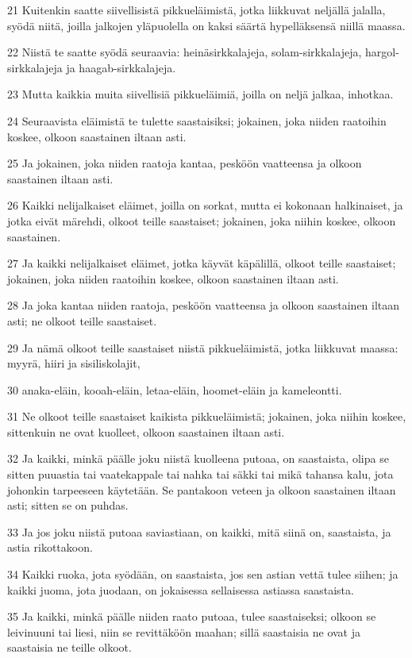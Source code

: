 \par 21 Kuitenkin saatte siivellisistä pikkueläimistä, jotka liikkuvat neljällä jalalla, syödä niitä, joilla jalkojen yläpuolella on kaksi säärtä hypelläksensä niillä maassa.
\par 22 Niistä te saatte syödä seuraavia: heinäsirkkalajeja, solam-sirkkalajeja, hargol-sirkkalajeja ja haagab-sirkkalajeja.
\par 23 Mutta kaikkia muita siivellisiä pikkueläimiä, joilla on neljä jalkaa, inhotkaa.
\par 24 Seuraavista eläimistä te tulette saastaisiksi; jokainen, joka niiden raatoihin koskee, olkoon saastainen iltaan asti.
\par 25 Ja jokainen, joka niiden raatoja kantaa, pesköön vaatteensa ja olkoon saastainen iltaan asti.
\par 26 Kaikki nelijalkaiset eläimet, joilla on sorkat, mutta ei kokonaan halkinaiset, ja jotka eivät märehdi, olkoot teille saastaiset; jokainen, joka niihin koskee, olkoon saastainen.
\par 27 Ja kaikki nelijalkaiset eläimet, jotka käyvät käpälillä, olkoot teille saastaiset; jokainen, joka niiden raatoihin koskee, olkoon saastainen iltaan asti.
\par 28 Ja joka kantaa niiden raatoja, pesköön vaatteensa ja olkoon saastainen iltaan asti; ne olkoot teille saastaiset.
\par 29 Ja nämä olkoot teille saastaiset niistä pikkueläimistä, jotka liikkuvat maassa: myyrä, hiiri ja sisiliskolajit,
\par 30 anaka-eläin, kooah-eläin, letaa-eläin, hoomet-eläin ja kameleontti.
\par 31 Ne olkoot teille saastaiset kaikista pikkueläimistä; jokainen, joka niihin koskee, sittenkuin ne ovat kuolleet, olkoon saastainen iltaan asti.
\par 32 Ja kaikki, minkä päälle joku niistä kuolleena putoaa, on saastaista, olipa se sitten puuastia tai vaatekappale tai nahka tai säkki tai mikä tahansa kalu, jota johonkin tarpeeseen käytetään. Se pantakoon veteen ja olkoon saastainen iltaan asti; sitten se on puhdas.
\par 33 Ja jos joku niistä putoaa saviastiaan, on kaikki, mitä siinä on, saastaista, ja astia rikottakoon.
\par 34 Kaikki ruoka, jota syödään, on saastaista, jos sen astian vettä tulee siihen; ja kaikki juoma, jota juodaan, on jokaisessa sellaisessa astiassa saastaista.
\par 35 Ja kaikki, minkä päälle niiden raato putoaa, tulee saastaiseksi; olkoon se leivinuuni tai liesi, niin se revittäköön maahan; sillä saastaisia ne ovat ja saastaisia ne teille olkoot.
